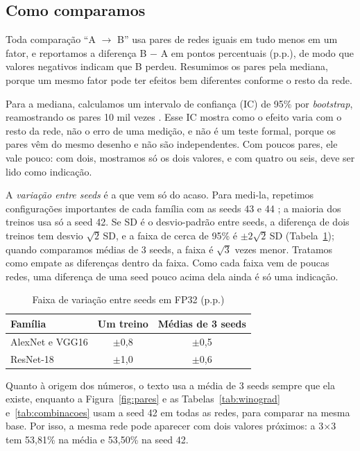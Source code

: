\documentclass[conference]{IEEEtran}
\newcommand{\by}{\ensuremath{\times}}
\begin{document}
\subsection{Como comparamos}
\label{sec:analise}

Toda comparação ``A $\rightarrow$ B'' usa pares de redes iguais em tudo menos em um fator, e reportamos a diferença B $-$ A em pontos
percentuais (p.p.), de modo que valores negativos indicam que B perdeu. Resumimos os pares pela mediana, porque um mesmo fator pode ter
efeitos bem diferentes conforme o resto da rede.

Para a mediana, calculamos um intervalo de confiança (IC) de 95\% por \textit{bootstrap}, reamostrando os pares 10 mil vezes
\cite{efron1993introduction}. Esse IC mostra como o efeito varia com o resto da rede, não o erro de uma medição, e não é um teste
formal, porque os pares vêm do mesmo desenho e não são independentes. Com poucos pares, ele vale pouco: com dois, mostramos só os dois
valores, e com quatro ou seis, deve ser lido como indicação.

A \textit{variação entre seeds} é a que vem só do acaso. Para medi-la, repetimos configurações importantes de cada família com as seeds
43 e 44 \cite{bouthillier2021accounting}; a maioria dos treinos usa só a seed 42. Se SD é o desvio-padrão entre seeds, a diferença de
dois treinos tem desvio $\sqrt{2}\,$SD, e a faixa de cerca de 95\% é $\pm 2\sqrt{2}\,$SD (Tabela~\ref{tab:ruido}); quando comparamos
médias de 3 seeds, a faixa é $\sqrt{3}$ vezes menor. Tratamos como empate as diferenças dentro da faixa. Como cada faixa vem de poucas
redes, uma diferença de uma seed pouco acima dela ainda é só uma indicação.

\begin{table}[!t]
\caption{Faixa de variação entre seeds em FP32 (p.p.)}
\label{tab:ruido}
\centering
\footnotesize
\begin{tabular}{@{}lcc@{}}
\toprule
\textbf{Família} & \textbf{Um treino} & \textbf{Médias de 3 seeds} \\
\midrule
AlexNet e VGG16 & $\pm$0,8 & $\pm$0,5 \\
ResNet-18 & $\pm$1,0 & $\pm$0,6 \\
\bottomrule
\end{tabular}
\end{table}

Quanto à origem dos números, o texto usa a média de 3 seeds sempre que ela existe, enquanto a Figura~\ref{fig:pares} e as
Tabelas~\ref{tab:winograd} e~\ref{tab:combinacoes} usam a seed 42 em todas as redes, para comparar na mesma base. Por isso, a mesma
rede pode aparecer com dois valores próximos: a 3\by3 tem 53,81\% na média e 53,50\% na seed 42.
\end{document}
